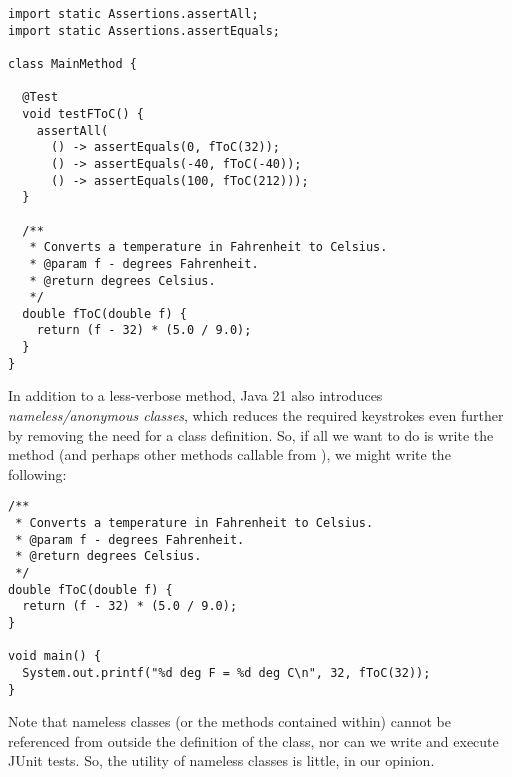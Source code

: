 \begin{lstlisting}[language=MyJava]
import static Assertions.assertAll;
import static Assertions.assertEquals;

class MainMethod {

  @Test
  void testFToC() {
    assertAll(
      () -> assertEquals(0, fToC(32));
      () -> assertEquals(-40, fToC(-40));
      () -> assertEquals(100, fToC(212)));
  }
  
  /**
   * Converts a temperature in Fahrenheit to Celsius.
   * @param f - degrees Fahrenheit.
   * @return degrees Celsius.
   */
  double fToC(double f) {
    return (f - 32) * (5.0 / 9.0); 
  }
}
\end{lstlisting}

In addition to a less-verbose  method, Java 21 also introduces \emph{nameless/anonymous classes}, which reduces the required keystrokes even further by removing the need for a class definition. So, if all we want to do is write the  method (and perhaps other methods callable from ), we might write the following:

\begin{lstlisting}[language=MyJava]
/**
 * Converts a temperature in Fahrenheit to Celsius.
 * @param f - degrees Fahrenheit.
 * @return degrees Celsius.
 */
double fToC(double f) {
  return (f - 32) * (5.0 / 9.0); 
}

void main() {
  System.out.printf("%d deg F = %d deg C\n", 32, fToC(32));
}
\end{lstlisting}

Note that nameless classes (or the methods contained within) cannot be referenced from outside the definition of the class, nor can we write and execute JUnit tests. So, the utility of nameless classes is little, in our opinion.




